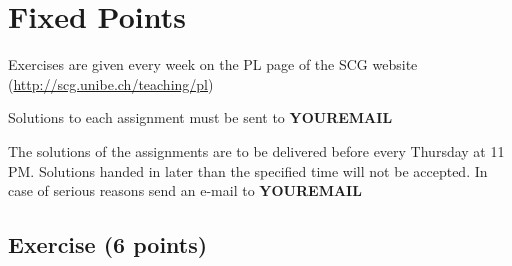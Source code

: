 \documentclass [11pt, a4wide, twoside]{article}
\begin{document}
\section*{\space{} Fixed Points}


\begin{myitemize}
\item Exercises are given every week on the PL page of the SCG website \\ (\url{http://scg.unibe.ch/teaching/pl})
\item Solutions to each assignment must be sent to \textbf{YOUREMAIL}
\item The solutions of the assignments are to be delivered before every Thursday at 11 PM. Solutions handed in later than the specified time will not be accepted. In case of serious reasons send an e-mail to  \textbf{YOUREMAIL}
\end{myitemize}


\subsection*{Exercise (6 points)}
\end{document}
